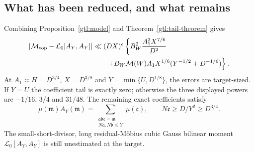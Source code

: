 \subsection{What has been reduced, and what remains}
\label{gtl:finite}
Combining Proposition~\ref{gtl:model} and
Theorem~\ref{gtl:tail-theorem} gives
\begin{equation}\label{gtl:combined}
 \begin{split}
 |\mathcal M_{\rm top}-\mathcal L_0[A_Y,A_Y]|
 &\ll (DX)^\epsilon\left\{
 B_W^2\frac{A_1^2X^{7/6}}{D^2}\right.\\
 &\qquad\left.+
 B_W\mathcal M(W)A_1X^{1/6}
                      (Y^{-1/2}+D^{-1/6})\right\}.
 \end{split}
\end{equation}
At $A_1\asymp H=D^{3/4}$, $X=D^{3/8}$ and
$Y=\min\{U,D^{1/8}\}$, the errors are target-sized. If $Y=U$ the
coefficient tail is exactly zero; otherwise the three displayed
powers are $-1/16$, $3/4$ and $31/48$. The remaining exact coefficients
satisfy
\begin{equation}\label{gtl:long-residual}
 \mu(\mathfrak m)A_Y(\mathfrak m)
  =\sum_{\substack{\mathfrak a\mathfrak b\mathfrak c=\mathfrak m\\
                   N\mathfrak a,N\mathfrak b\le Y}}\mu(\mathfrak c),
 \qquad N\mathfrak c\ge D/Y^2\ge D^{3/4}.
\end{equation}
The small-short-divisor, long residual-M\"obius cubic Gauss bilinear
moment $\mathcal L_0[A_Y,A_Y]$ is still unestimated at the target.


